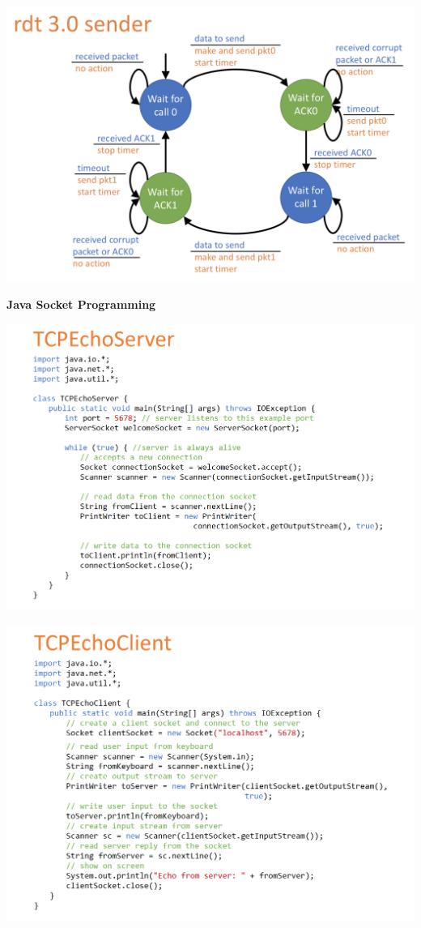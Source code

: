 \documentclass[a4paper]{article} \usepackage[backend=biber, style=numeric, sorting=none]{biblatex}
\begin{document}
\begin{multicols*}{4}
{\centering \includegraphics[scale=0.27]{rdt_3}}

\textbf{Java Socket Programming}

{\centering \includegraphics[scale=0.17]{TCPEchoServer}}

{\centering \includegraphics[scale=0.17]{TCPEchoClient}}

    \end{multicols*}
\end{document}
